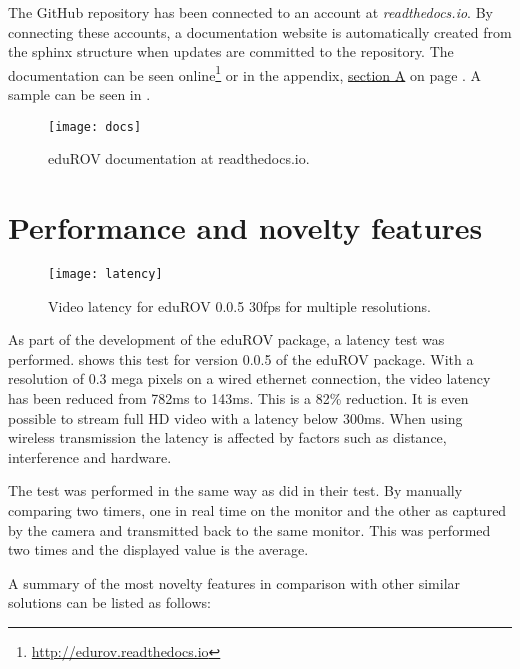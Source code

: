 The GitHub repository has been connected to an account at \emph{readthedocs.io}. By connecting these accounts, a documentation website is automatically created from the sphinx structure when updates are committed to the repository. The documentation can be seen online\footnote{\url{http://edurov.readthedocs.io}} or in the appendix, \hyperref[appDoc]{section A} on page \pageref{appDoc}. A sample can be seen in .

\begin{figure}[h!]
    \centering
    \texttt{[image: docs]}
    \caption{eduROV documentation at readthedocs.io.}
    \label{docs}
\end{figure}
\clearpage
\section{Performance and novelty features}

\begin{figure}[h!]
    \centering
    \texttt{[image: latency]}
    \caption{Video latency for eduROV 0.0.5 \@ 30fps for multiple resolutions.}
    \label{latency}
\end{figure}

As part of the development of the eduROV package, a latency test was performed.  shows this test for version 0.0.5 of the eduROV package. With a resolution of 0.3 mega pixels on a wired ethernet connection, the video latency has been reduced from 782ms to 143ms. This is a 82\% reduction. It is even possible to stream full HD video with a latency below 300ms. When using wireless transmission the latency is affected by factors such as distance, interference and hardware. 

The test was performed in the same way as \citet{Jennhag2016} did in their test. By manually comparing two timers, one in real time on the monitor and the other as captured by the camera and transmitted back to the same monitor. This was performed two times and the displayed value is the average.

\clearpage
A summary of the most novelty features in comparison with other similar solutions can be listed as follows:

